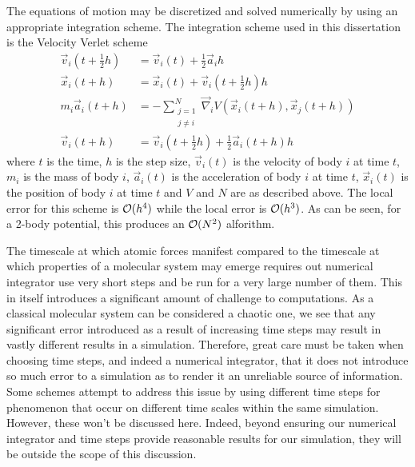 %
The equations of motion may be discretized and solved numerically
by using an appropriate integration scheme.
The integration scheme used in this dissertation is
the Velocity Verlet scheme
\begin{align}
\label{eqn:velocity_verlet_scheme}
    \vec{v}_i(t + \tfrac{1}{2} h) &=
        \vec{v}_i(t) + \tfrac{1}{2}\vec{a}_i h
    \\
    \vec{x}_i(t + h) &=
        \vec{x}_i(t) + \vec{v}_i(t + \tfrac{1}{2} h) h
    \\
    m_i \vec{a}_i(t + h) &=
        - \sum_{\substack{j=1\\j\ne{}i}}^N
            \vec{\nabla}_i V(\vec{x}_i(t+h), \vec{x}_j(t+h))
    \\
    \vec{v}_i(t+h) &=
        \vec{v}_i(t + \tfrac{1}{2} h) + \tfrac{1}{2} \vec{a}_i(t + h) h
\end  {align}
where $t$ is the time,
$h$ is the step size,
$\vec{v}_i(t)$ is the velocity of body $i$ at time $t$,
$m_i$ is the mass of body $i$,
$\vec{a}_i(t)$ is the acceleration of body $i$ at time $t$,
$\vec{x}_i(t)$ is the position of body $i$ at time $t$ and
$V$ and $N$ are as described above.
%
The local error for this scheme is $\mathcal{O}{(h^4)}$ while the local error
is $\mathcal{O}{(h^3)}$.
%
As can be seen, for a 2-body potential,
this produces an $\mathcal{O}{(N^2)}$ alforithm.

%
The timescale at which atomic forces manifest compared to
the timescale at which properties of a molecular system may emerge
requires out numerical integrator use very short steps and be run for
a very large number of them.
%
This in itself introduces a significant amount of challenge to computations.
%
As a classical molecular system can be considered a chaotic one,
we see that any significant error introduced as a result of
increasing time steps may result in
vastly different results in a simulation.
%
Therefore, great care must be taken when choosing time steps, and
indeed a numerical integrator,
that it does not introduce so much error to a simulation as to render it
an unreliable source of information.
%
Some schemes attempt to address this issue by
using different time steps for phenomenon that occur on
different time scales within the same simulation.
%
However, these won’t be discussed here.
%
Indeed, beyond ensuring our numerical integrator and time steps provide
reasonable results for our simulation,
they will be outside the scope of this discussion.



